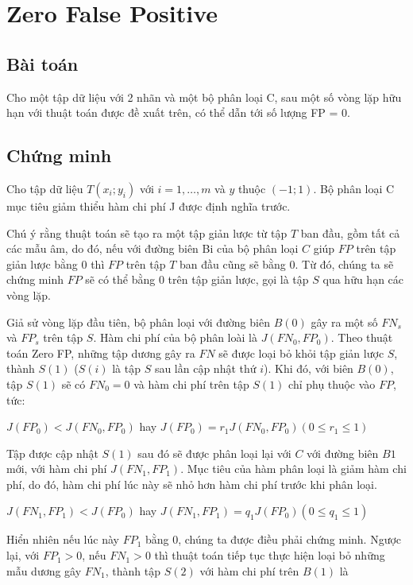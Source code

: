 \documentclass[./../main.tex]{subfiles}
\begin{document}
\section{Zero False Positive}
\subsection*{Bài toán}
Cho một tập dữ liệu với 2 nhãn và một bộ phân loại C, sau một số vòng lặp hữu hạn với thuật toán được đề xuất trên, có thể dẫn tới số lượng FP = 0.

\subsection*{Chứng minh}

Cho tập dữ liệu $T (x_i;y_i)$ với $i=1,\ldots,m$ và $y$ thuộc $(-1;1)$. Bộ phân loại C mục tiêu giảm thiểu hàm chi phí J được định nghĩa trước.


Chú ý rằng thuật toán sẽ tạo ra một tập giản lược từ tập $T$ ban đầu, gồm tất cả các mẫu âm, do đó, nếu với đường biên Bi của bộ phân loại $C$ giúp $FP$ trên tập giản lược bằng 0 thì $FP$ trên tập $T$ ban đầu cũng sẽ bằng 0. Từ đó, chúng ta sẽ chứng minh $FP$ sẽ có thể bằng $0$ trên tập giản lược, gọi là tập $S$ qua hữu hạn các vòng lặp.


Giả sử vòng lặp đầu tiên, bộ phân loại với đường biên $B(0)$ gây ra một số $FN_s$ và $FP_s$ trên tập $S$. Hàm chi phí của bộ phân loài là $J(FN_0,FP_0)$. Theo thuật toán Zero FP, những tập dương gây ra $FN $ sẽ được loại bỏ khỏi tập giản lược $S$, thành $S(1)$ ($S(i)$ là tập $S$ sau lần cập nhật thứ $i$). Khi đó, với biên $B(0)$, tập $S(1)$ sẽ có $FN_0 = 0$ và hàm chi phí trên tập $S(1)$ chỉ phụ thuộc vào $FP$, tức:

$J(FP_0) < J(FN_0, FP_0)$ hay $J(FP_0) = r_1 J(FN_0, FP_0) ( 0 \leq r_1 \leq 1)$

Tập được cập nhật $S(1)$ sau đó sẽ được phân loại lại với $C$ với đường biên $B1$ mới, với hàm chi phí $J(FN_1, FP_1)$. Mục tiêu của hàm phân loại là giảm hàm chi phí, do đó, hàm chi phí lúc này sẽ nhỏ hơn hàm chi phí trước khi phân loại.


$J(FN_1, FP_1) < J(FP_0)$ hay $J(FN_1, FP_1) = q_1 J(FP_0) (0 \leq q_1 \leq 1)$

Hiển nhiên nếu lúc này $FP_1$ bằng 0, chúng ta được điều phải chứng minh. Ngược lại, với $FP_1 >0$, nếu $FN_1 > 0$ thì thuật toán tiếp tục thực hiện loại bỏ những mẫu dương gây $FN_1$, thành tập $S(2)$ với hàm chi phí trên $B(1)$ là
\end{document}
